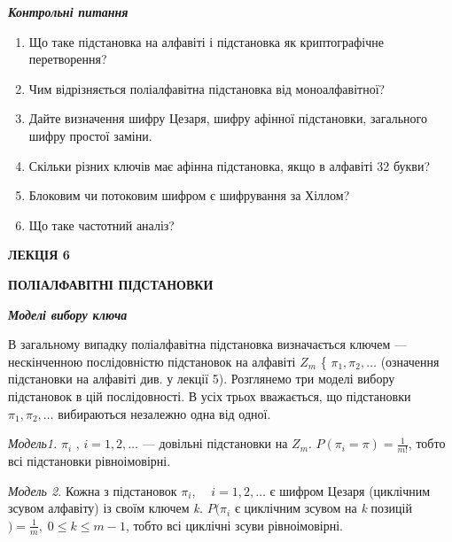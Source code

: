 \bigskip


\bigskip


\bigskip

{\centering\bfseries\itshape
Контрольні питання
\par}


\bigskip

\liststyleWWviiiNumxiv
\begin{enumerate}
\item Що таке підстановка на алфавіті і підстановка як криптографічне
перетворення?
\item Чим відрізняється поліалфавітна підстановка від моноалфавітної?
\item Дайте визначення шифру Цезаря, шифру афінної підстановки, загального шифру
простої заміни.
\item Скільки різних ключів має афінна підстановка, якщо в алфавіті 32 букви?
\item Блоковим чи потоковим шифром є шифрування за Хіллом?
\item Що таке частотний аналіз?
\end{enumerate}

\bigskip


\bigskip


\bigskip

{\bfseries
ЛЕКЦІЯ  6}


\bigskip

{\centering\bfseries
ПОЛІАЛФАВІТНІ  ПІДСТАНОВКИ
\par}


\bigskip


\bigskip

{\centering\bfseries\itshape
Моделі вибору ключа
\par}


\bigskip


\bigskip

В загальному випадку поліалфавітна підстановка визначається ключем ---
нескінченною послідовністю підстановок на алфавіті  $Z_m$ \{ ${\pi
_{1},\pi _{2},\dots}$ (означення підстановки на алфавіті
див. у лекції 5). Розглянемо три моделі вибору підстановок в цій послідовності.
В усіх трьох вважається, що підстановки  ${\pi _{1},\pi
_{2},\dots}$ вибираються незалежно одна від одної.

\textit{Модель1.  } $\pi _i$ ,  $i=1,2,\dots$ ---
довільні підстановки на  $Z_m$.  $P(\pi _{i}=\pi )=\frac1{m!}$,
тобто всі підстановки рівноімовірні.

 \textit{Модель 2.  } Кожна з підстановок  ${\pi
_{i},\;\;\;\;i=1,2,\dots}$ є шифром Цезаря (циклічним
зсувом алфавіту) із своїм ключем \textit{k}\textit{.}   $P(\pi _i$ є
циклічним зсувом на \textit{k} позицій $)=\frac{1}m,\;0\le k\le m-1$, тобто
всі циклічні зсуви  рівноімовірні. $ $

